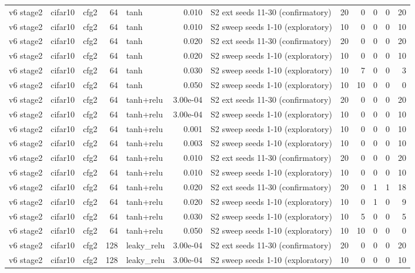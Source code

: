 \begin{table}[htbp]
{\begin{tabular}{@{}lllrlrlrrrrr@{}}
v6 stage2 & cifar10 & cfg2 & 64 & tanh & 0.010 & S2 ext seeds 11-30 (confirmatory) & 20 & 0 & 0 & 0 & 20 \\
v6 stage2 & cifar10 & cfg2 & 64 & tanh & 0.010 & S2 sweep seeds 1-10 (exploratory) & 10 & 0 & 0 & 0 & 10 \\
v6 stage2 & cifar10 & cfg2 & 64 & tanh & 0.020 & S2 ext seeds 11-30 (confirmatory) & 20 & 0 & 0 & 0 & 20 \\
v6 stage2 & cifar10 & cfg2 & 64 & tanh & 0.020 & S2 sweep seeds 1-10 (exploratory) & 10 & 0 & 0 & 0 & 10 \\
v6 stage2 & cifar10 & cfg2 & 64 & tanh & 0.030 & S2 sweep seeds 1-10 (exploratory) & 10 & 7 & 0 & 0 & 3 \\
v6 stage2 & cifar10 & cfg2 & 64 & tanh & 0.050 & S2 sweep seeds 1-10 (exploratory) & 10 & 10 & 0 & 0 & 0 \\
v6 stage2 & cifar10 & cfg2 & 64 & tanh+relu & 3.00e-04 & S2 ext seeds 11-30 (confirmatory) & 20 & 0 & 0 & 0 & 20 \\
v6 stage2 & cifar10 & cfg2 & 64 & tanh+relu & 3.00e-04 & S2 sweep seeds 1-10 (exploratory) & 10 & 0 & 0 & 0 & 10 \\
v6 stage2 & cifar10 & cfg2 & 64 & tanh+relu & 0.001 & S2 sweep seeds 1-10 (exploratory) & 10 & 0 & 0 & 0 & 10 \\
v6 stage2 & cifar10 & cfg2 & 64 & tanh+relu & 0.003 & S2 sweep seeds 1-10 (exploratory) & 10 & 0 & 0 & 0 & 10 \\
v6 stage2 & cifar10 & cfg2 & 64 & tanh+relu & 0.010 & S2 ext seeds 11-30 (confirmatory) & 20 & 0 & 0 & 0 & 20 \\
v6 stage2 & cifar10 & cfg2 & 64 & tanh+relu & 0.010 & S2 sweep seeds 1-10 (exploratory) & 10 & 0 & 0 & 0 & 10 \\
v6 stage2 & cifar10 & cfg2 & 64 & tanh+relu & 0.020 & S2 ext seeds 11-30 (confirmatory) & 20 & 0 & 1 & 1 & 18 \\
v6 stage2 & cifar10 & cfg2 & 64 & tanh+relu & 0.020 & S2 sweep seeds 1-10 (exploratory) & 10 & 0 & 1 & 0 & 9 \\
v6 stage2 & cifar10 & cfg2 & 64 & tanh+relu & 0.030 & S2 sweep seeds 1-10 (exploratory) & 10 & 5 & 0 & 0 & 5 \\
v6 stage2 & cifar10 & cfg2 & 64 & tanh+relu & 0.050 & S2 sweep seeds 1-10 (exploratory) & 10 & 10 & 0 & 0 & 0 \\
v6 stage2 & cifar10 & cfg2 & 128 & leaky\_relu & 3.00e-04 & S2 ext seeds 11-30 (confirmatory) & 20 & 0 & 0 & 0 & 20 \\
v6 stage2 & cifar10 & cfg2 & 128 & leaky\_relu & 3.00e-04 & S2 sweep seeds 1-10 (exploratory) & 10 & 0 & 0 & 0 & 10 \\

\end{tabular}}
\end{table}
